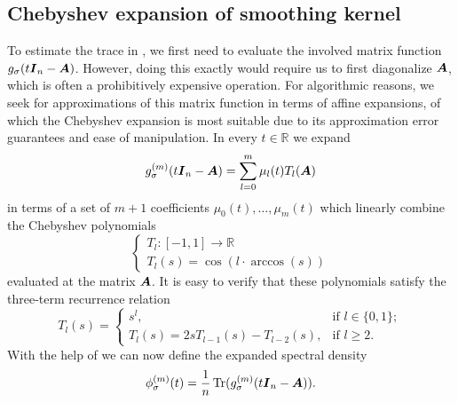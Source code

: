\documentclass[12pt]{article}
\begin{document}
\subsection{Chebyshev expansion of smoothing kernel}
\label{subsec:chebyshev-expansion}

To estimate the trace in , we first need to evaluate the involved matrix function $g_{\sigma}(t\boldsymbol{I}_n - \boldsymbol{A})$. However, doing this exactly would require us to first diagonalize $\boldsymbol{A}$, which is often a prohibitively expensive operation. For algorithmic reasons, we seek for approximations of this matrix function in terms of affine expansions, of which the Chebyshev expansion is most suitable due to its approximation error guarantees and ease of manipulation. In every $t \in \mathbb{R}$ we expand 
\begin{equation}
    g_{\sigma}^{(m)}(t\boldsymbol{I}_n - \boldsymbol{A}) = \sum_{l=0}^{m} \mu_l(t) T_l(\boldsymbol{A})
    \label{equ:matrix-expansion}
\end{equation}
in terms of a set of $m+1$ coefficients $\mu_0(t), \dots, \mu_m(t)$ which linearly combine the Chebyshev polynomials
\begin{equation}
    \begin{cases}
        T_l : [-1, 1] \to \mathbb{R} \\
        T_l(s) = \cos(l \cdot \arccos(s))
    \end{cases}
    \label{equ:chebyshev-polynomial}
\end{equation}
evaluated at the matrix $\boldsymbol{A}$. It is easy to verify that these polynomials satisfy the three-term recurrence relation
\begin{equation}
    T_l(s) =
    \begin{cases}
        s^l, & \text{if $l \in \{0, 1\}$}; \\
        T_l(s) = 2 s T_{l-1}(s) - T_{l-2}(s), & \text{if $l \geq 2$.}
    \end{cases}
    \label{equ:chebyshev-recurrence}
\end{equation}
With the help of  we can now define the expanded spectral density
\begin{equation}
    \phi_{\sigma}^{(m)}(t) =  \frac{1}{n} \operatorname{Tr}(g_{\sigma}^{(m)}(t \boldsymbol{I}_n - \boldsymbol{A})).
    \label{equ:expanded-spectral-density}
\end{equation}
\end{document}
